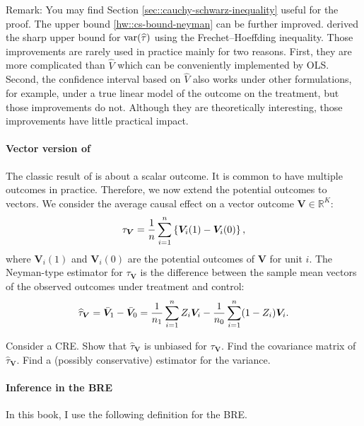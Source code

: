 Remark:
You may find Section \ref{sec::cauchy-schwarz-inequality} useful for the proof.
The upper bound \eqref{hw::cs-bound-neyman} can be further improved.
\citet{aronow2014sharp} derived the sharp upper bound for $\textup{var}(\widehat{\tau}) $ using the Frechet--Hoeffding inequality. Those improvements are rarely used in practice mainly for two reasons. First, they are more complicated than $\hat{V}$ which can be conveniently implemented by OLS. Second, the confidence interval based on  $\hat{V}$ also works under other formulations, for example, under a true linear model of the outcome on the treatment, but those improvements do not. Although they are theoretically interesting, those improvements have little practical impact.



\paragraph{Vector version of \citet{Neyman:1923}} \label{hw::vector-neyman1923}

The classic result of \citet{Neyman:1923} is about a scalar outcome. It is common to have multiple outcomes in practice. Therefore, we now extend the potential outcomes to vectors. We consider the average causal effect on a vector outcome $\boldsymbol{V}  \in \mathbb{R}^K$:
$$
\tau_{\boldsymbol{V}} = \frac{1}{n}  \sum_{i=1}^n \left\{  \boldsymbol{V}_i(1) - \boldsymbol{V}_i(0) \right\},
$$
where $\boldsymbol{V}_i(1)$ and $\boldsymbol{V}_i(0)$ are the potential outcomes of $\boldsymbol{V}$ for unit $i$.
The Neyman-type estimator for $\tau_{\boldsymbol{V}}$ is the difference between the sample mean vectors of the observed outcomes under treatment and control:
$$
\widehat{ \tau}_{\boldsymbol{V}} = \bar{\boldsymbol{V}}_1  - \bar{\boldsymbol{V}}_0
= \frac{1}{n_1}   \sum_{i=1}^n Z_i  \boldsymbol{V}_i   - \frac{1}{n_0}  \sum_{i=1}^n (1-Z_i) \boldsymbol{V}_i .
$$


Consider a CRE. Show that $\widehat{ \tau}_{\boldsymbol{V}} $ is unbiased for $\tau_{\boldsymbol{V}} $. Find the covariance matrix of $\widehat{ \tau}_{\boldsymbol{V}} $. Find a (possibly conservative) estimator for the variance.


\paragraph{Inference in the BRE}\label{hw::bre-inference}


In this book, I use the following definition for the BRE.

